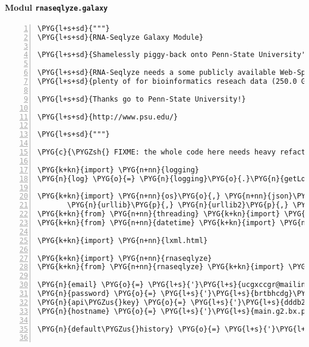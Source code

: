 \paragraph{Modul \texttt{rnaseqlyze.galaxy}}
\label{rnaseqlyze-pdf:modul-rnaseqlyze-galaxy}
\begin{Verbatim}[commandchars=\\\{\},numbers=left,firstnumber=1,stepnumber=5]
\PYG{l+s+sd}{"""}
\PYG{l+s+sd}{RNA-Seqlyze Galaxy Module}

\PYG{l+s+sd}{Shamelessly piggy-back onto Penn-State University's "Galaxy" Project.}

\PYG{l+s+sd}{RNA-Seqlyze needs a some publicly available Web-Space, which PSU provides}
\PYG{l+s+sd}{plenty of for bioinformatics reseach data (250.0 Gb per user as of 4 Jul 2012).}

\PYG{l+s+sd}{Thanks go to Penn-State University!}

\PYG{l+s+sd}{http://www.psu.edu/}

\PYG{l+s+sd}{"""}

\PYG{c}{\PYGZsh{} FIXME: the whole code here needs heavy refactoring}

\PYG{k+kn}{import} \PYG{n+nn}{logging}
\PYG{n}{log} \PYG{o}{=} \PYG{n}{logging}\PYG{o}{.}\PYG{n}{getLogger}\PYG{p}{(}\PYG{n}{\PYGZus{}\PYGZus{}name\PYGZus{}\PYGZus{}}\PYG{p}{)}

\PYG{k+kn}{import} \PYG{n+nn}{os}\PYG{o}{,} \PYG{n+nn}{json}\PYG{o}{,} \PYG{n+nn}{time}\PYG{o}{,} \PYG{n+nn}{ftplib}\PYG{o}{,} \PYGZbs{}
       \PYG{n}{urllib}\PYG{p}{,} \PYG{n}{urllib2}\PYG{p}{,} \PYG{n}{cookielib}
\PYG{k+kn}{from} \PYG{n+nn}{threading} \PYG{k+kn}{import} \PYG{n}{local}
\PYG{k+kn}{from} \PYG{n+nn}{datetime} \PYG{k+kn}{import} \PYG{n}{datetime}\PYG{p}{,} \PYG{n}{timedelta}

\PYG{k+kn}{import} \PYG{n+nn}{lxml.html}

\PYG{k+kn}{import} \PYG{n+nn}{rnaseqlyze}
\PYG{k+kn}{from} \PYG{n+nn}{rnaseqlyze} \PYG{k+kn}{import} \PYG{n}{multipart}

\PYG{n}{email} \PYG{o}{=} \PYG{l+s}{'}\PYG{l+s}{ucgxccgr@mailinator.com}\PYG{l+s}{'}
\PYG{n}{password} \PYG{o}{=} \PYG{l+s}{'}\PYG{l+s}{brtbhcdg}\PYG{l+s}{'}
\PYG{n}{api\PYGZus{}key} \PYG{o}{=} \PYG{l+s}{'}\PYG{l+s}{dddb2c53c96c0c4d263e6c74b507d203}\PYG{l+s}{'}
\PYG{n}{hostname} \PYG{o}{=} \PYG{l+s}{'}\PYG{l+s}{main.g2.bx.psu.edu}\PYG{l+s}{'}

\PYG{n}{default\PYGZus{}history} \PYG{o}{=} \PYG{l+s}{'}\PYG{l+s}{16f9a8e916e0e908}\PYG{l+s}{'}


\end{Verbatim}
